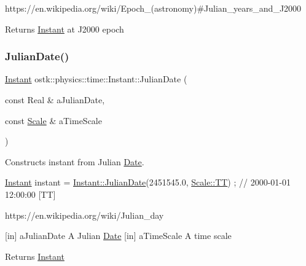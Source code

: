 https\+://en.wikipedia.\+org/wiki/\+Epoch\+\_\+(astronomy)\#\+Julian\+\_\+years\+\_\+and\+\_\+\+J2000

\begin{DoxyReturn}{Returns}
\hyperlink{classostk_1_1physics_1_1time_1_1_instant}{Instant} at J2000 epoch 
\end{DoxyReturn}
\mbox{\label{classostk_1_1physics_1_1time_1_1_instant_a8826d68093086f8b203a5be940ef34fb}} 
\subsubsection{\texorpdfstring{Julian\+Date()}{JulianDate()}}
{\footnotesize\ttfamily \hyperlink{classostk_1_1physics_1_1time_1_1_instant}{Instant} ostk\+::physics\+::time\+::\+Instant\+::\+Julian\+Date (\begin{DoxyParamCaption}\item[{const Real \&}]{a\+Julian\+Date,  }\item[{const \hyperlink{namespaceostk_1_1physics_1_1time_adf23d37bd8641fb76a0e98ab46a70df7}{Scale} \&}]{a\+Time\+Scale }\end{DoxyParamCaption})\hspace{0.3cm}{\ttfamily [static]}}



Constructs instant from Julian \hyperlink{classostk_1_1physics_1_1time_1_1_date}{Date}. 


\begin{DoxyCode}
\hyperlink{classostk_1_1physics_1_1time_1_1_instant_a132c1e4b2fe9a9a671109206e297bd5d}{Instant} instant = \hyperlink{classostk_1_1physics_1_1time_1_1_instant_a8826d68093086f8b203a5be940ef34fb}{Instant::JulianDate}(2451545.0, 
      \hyperlink{namespaceostk_1_1physics_1_1time_adf23d37bd8641fb76a0e98ab46a70df7adf1f3edb9115acb0a1e04209b7a9937b}{Scale::TT}) ; \textcolor{comment}{// 2000-01-01 12:00:00 [TT]}
\end{DoxyCode}


https\+://en.wikipedia.\+org/wiki/\+Julian\+\_\+day

\mbox{[}in\mbox{]} a\+Julian\+Date A Julian \hyperlink{classostk_1_1physics_1_1time_1_1_date}{Date}  \mbox{[}in\mbox{]} a\+Time\+Scale A time scale \begin{DoxyReturn}{Returns}
\hyperlink{classostk_1_1physics_1_1time_1_1_instant}{Instant} 
\end{DoxyReturn}
\mbox{\label{classostk_1_1physics_1_1time_1_1_instant_af515c6d0547e40a337efb865a71c2558}} 
